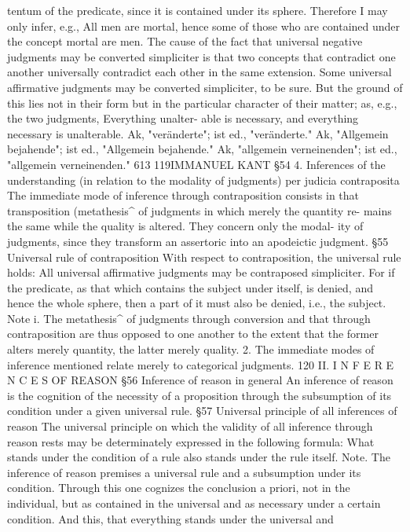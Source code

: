 tentum of the predicate, since it is contained under its sphere. Therefore I
may only infer, e.g., All men are mortal, hence some of those who are
contained under the concept mortal are men. The cause of the fact that
universal negative judgments may be converted simpliciter is that two
concepts that contradict one another universally contradict each other in
the same extension.
Some universal affirmative judgments may be converted simpliciter, to be
sure. But the ground of this lies not in their form but in the particular
character of their matter; as, e.g., the two judgments, Everything unalter-
able is necessary, and everything necessary is unalterable.
Ak, "veränderte"; ist ed., "veränderte."
Ak, "Allgemein bejahende"; ist ed., "Allgemein bejahende."
Ak, "allgemein verneinenden"; ist ed., "allgemein verneinenden."
613
119IMMANUEL KANT
§54
4. Inferences of the understanding (in relation to the modality of
judgments) per judicia contraposita
The immediate mode of inference through contraposition consists in that
transposition (metathesis^ of judgments in which merely the quantity re-
mains the same while the quality is altered. They concern only the modal-
ity of judgments, since they transform an assertoric into an apodeictic
judgment.
§55
Universal rule of contraposition
With respect to contraposition, the universal rule holds:
All universal affirmative judgments may be contraposed simpliciter. For if
the predicate, as that which contains the subject under itself, is denied,
and hence the whole sphere, then a part of it must also be denied, i.e., the
subject.
Note i. The metathesis^ of judgments through conversion and that through
contraposition are thus opposed to one another to the extent that the
former alters merely quantity, the latter merely quality.
2. The immediate modes of inference mentioned relate merely to categorical
judgments.
120
II. I N F E R E N C E S OF REASON
§56
Inference of reason in general
An inference of reason is the cognition of the necessity of a proposition
through the subsumption of its condition under a given universal rule.
§57
Universal principle of all inferences of reason
The universal principle on which the validity of all inference through
reason rests may be determinately expressed in the following formula:
What stands under the condition of a rule also stands under the rule
itself.
Note.
The inference of reason premises a universal rule and a subsumption under
its condition. Through this one cognizes the conclusion a priori, not in the
individual, but as contained in the universal and as necessary under a
certain condition. And this, that everything stands under the universal and
